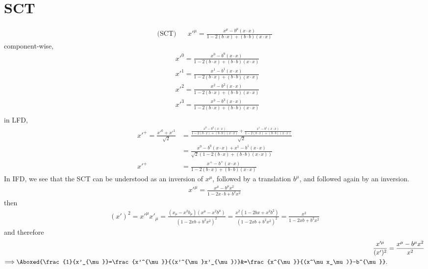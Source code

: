 \documentclass[]{article}
\numberwithin{equation}{section}
\begin{document}
\section{SCT}
\begin{align*}
\text{(SCT)}~~~~&{ x'^{\mu }={\frac {x^{\mu }-b^{\mu }(x\cdot x)}{1-2(b\cdot x)+(b\cdot b)(x \cdot x)}}}
\end{align*}
component-wise,
\begin{align}
&{ x'^{0 }={\frac {x^{0 }-b^{0 }(x\cdot x)}{1-2(b\cdot x)+(b\cdot b)(x \cdot x)}}}\\
&{ x'^{1 }={\frac {x^{1 }-b^{1 }(x\cdot x)}{1-2(b\cdot x)+(b\cdot b)(x \cdot x)}}}\\
&{ x'^{2 }={\frac {x^{2 }-b^{2 }(x\cdot x)}{1-2(b\cdot x)+(b\cdot b)(x \cdot x)}}}\\
&{ x'^{3 }={\frac {x^{3 }-b^{3 }(x\cdot x)}{1-2(b\cdot x)+(b\cdot b)(x \cdot x)}}}\\
\end{align}
in LFD,
\begin{align}
   x'^{+ } =\frac{x'^{0 }+x'^{1 }}{\sqrt{2}}&=\frac{{\frac {x^{0 }-b^{0 }(x\cdot x)}{1-2(b\cdot x)+(b\cdot b)(x \cdot x)}}+{\frac {x^{1 }-b^{1 }(x\cdot x)}{1-2(b\cdot x)+(b\cdot b)(x \cdot x)}}}{\sqrt{2}}\\
   &={\frac {x^{0 }-b^{0 }(x\cdot x)+x^{1 }-b^{1 }(x\cdot x)}{\sqrt{2}(1-2(b\cdot x)+(b\cdot b)(x \cdot x))}}\\
   x'^{+ } &={\frac {x^{+ }-b^{+ }(x\cdot x)}{1-2(b\cdot x)+(b\cdot b)(x \cdot x)}}
\end{align}
In IFD, we see that the SCT can be understood as an inversion of $x^\mu$,
followed by a translation $b^\mu$, and followed again by an inversion.
\begin{align}
    x'^{\mu} = \frac{x^{\mu} - b^{\mu}x^2}{1-2x\cdot b + b^2 x^2}
\end{align}
then
\begin{align}
    (x')^2=x'^{\mu}x'_{\mu} = \frac{(x_\mu-x^2 b_\mu)(x^\mu-x^2 b^\mu)}{(1-2xb+b^2x^2)^2}=\frac{x^2(1-2bx+x^2b^2) }{(1-2xb+b^2x^2)^2}=\frac{x^2}{1-2xb+b^2x^2}
\end{align}
and therefore
\begin{align}
    \frac{x'^{\mu}}{(x')^2} &= \frac{x^{\mu} - b^{\mu}x^2}{x^2}\\
\Longrightarrow \Aboxed{\frac{1}{x'_{\mu }}=\frac {x'^{\mu}}{(x'^{\mu}x'_{\mu})}&=\frac {x^{\mu}}{(x^\mu  x_\mu)}-b^{\mu}}.
\end{align}
\end{document}
